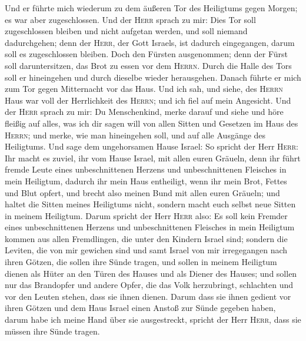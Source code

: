  Und er führte mich wiederum zu dem äußeren Tor des
Heiligtums gegen Morgen; es war aber zugeschlossen.  Und
der \textsc{Herr} sprach zu mir: Dies Tor soll zugeschlossen bleiben und
nicht aufgetan werden, und soll niemand dadurchgehen; denn der
\textsc{Herr}, der Gott Israels, ist dadurch eingegangen, darum soll es
zugeschlossen bleiben.  Doch den Fürsten ausgenommen; denn
der Fürst soll daruntersitzen, das Brot zu essen vor dem \textsc{Herrn}.
Durch die Halle des Tors soll er hineingehen und durch dieselbe wieder
herausgehen.  Danach führte er mich zum Tor gegen
Mitternacht vor das Haus. Und ich sah, und siehe, des \textsc{Herrn}
Haus war voll der Herrlichkeit des \textsc{Herrn}; und ich fiel auf mein
Angesicht.  Und der \textsc{Herr} sprach zu mir: Du
Menschenkind, merke darauf und siehe und höre fleißig auf alles, was ich
dir sagen will von allen Sitten und Gesetzen im Haus des \textsc{Herrn};
und merke, wie man hineingehen soll, und auf alle Ausgänge des
Heiligtums.  Und sage dem ungehorsamen Hause Israel: So
spricht der Herr \textsc{Herr}: Ihr macht es zuviel, ihr vom Hause
Israel, mit allen euren Gräueln,  denn ihr führt fremde
Leute eines unbeschnittenen Herzens und unbeschnittenen Fleisches in
mein Heiligtum, dadurch ihr mein Haus entheiligt, wenn ihr mein Brot,
Fettes und Blut opfert, und brecht also meinen Bund mit allen euren
Gräueln;  und haltet die Sitten meines Heiligtums nicht,
sondern macht euch selbst neue Sitten in meinem Heiligtum.
 Darum spricht der Herr \textsc{Herr} also: Es soll kein
Fremder eines unbeschnittenen Herzens und unbeschnittenen Fleisches in
mein Heiligtum kommen aus allen Fremdlingen, die unter den Kindern
Israel sind;  sondern die Leviten, die von mir gewichen
sind und samt Israel von mir irregegangen nach ihren Götzen, die sollen
ihre Sünde tragen,  und sollen in meinem Heiligtum dienen
als Hüter an den Türen des Hauses und als Diener des Hauses; und sollen
nur das Brandopfer und andere Opfer, die das Volk herzubringt,
schlachten und vor den Leuten stehen, dass sie ihnen dienen.
 Darum dass sie ihnen gedient vor ihren Götzen und dem
Haus Israel einen Anstoß zur Sünde gegeben haben, darum habe ich meine
Hand über sie ausgestreckt, spricht der Herr \textsc{Herr}, dass sie
müssen ihre Sünde tragen.


